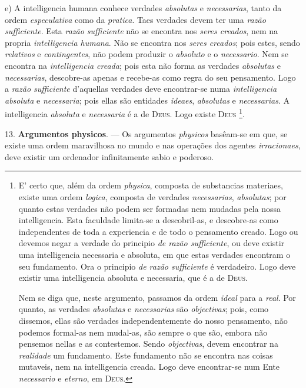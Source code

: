 e) A intelligencia humana conhece verdades \emph{absolutas} e \emph{necessarias}, tanto da ordem \emph{especulativa} como da \emph{pratica}. Taes verdades devem ter uma \emph{razão sufficiente}. Esta \emph{razão sufficiente} não se encontra nos \emph{seres creados}, nem na propria \emph{intelligencia humana}. Não se encontra nos \emph{seres creados}; pois estes, sendo \emph{relativos} e \emph{contingentes}, não podem produzir o \emph{absoluto} e o \emph{necessario}. Nem se encontra na \emph{intelligencia creada}; pois esta não forma as verdades \emph{absolutas} e \emph{necessarias}, descobre-as apenas e recebe-as como regra do seu pensamento. Logo a \emph{razão sufficiente} d'aquellas verdades deve encontrar-se numa \emph{intelligencia absoluta} e \emph{necessaria}; pois ellas são entidades \emph{ideaes}, \emph{absolutas} e \emph{necessarias}. A intelligencia \emph{absoluta} e \emph{necessaria} é a de \textsc{Deus}. Logo existe \textsc{Deus} \footnote{E' certo que, além da ordem \emph{physica}, composta de substancias materiaes, existe uma ordem \emph{logica}, composta de verdades \emph{necessarias}, \emph{absolutas}; por quanto estas verdades não podem ser formadas nem mudadas pela nossa intelligencia. Esta faculdade limita-se a descobril-as, e descobre-as como independentes de toda a experiencia e de todo o pensamento creado. Logo ou devemos negar a verdade do principio \emph{de razão sufficiente}, ou deve existir uma intelligencia necessaria e absoluta, em que estas verdades encontram o seu fundamento. Ora o principio \emph{de razão sufficiente} é verdadeiro. Logo deve existir uma intelligencia absoluta e necessaria, que é a de \textsc{Deus}.\par Nem se diga que, neste argumento, passamos da ordem \emph{ideal} para a \emph{real}. Por quanto, as verdades \emph{absolutas} e \emph{necessarias} são \emph{objectivas}; pois, como dissemos, ellas são verdades independentemente do nosso pensamento, não podemos formal-as nem mudal-as, são sempre o que são, embora não pensemos nellas e as contestemos. Sendo \emph{objectivas}, devem encontrar na \emph{realidade} um fundamento. Este fundamento não se encontra nas coisas mutaveis, nem na intelligencia creada. Logo deve encontrar-se num Ente \emph{necessario} e \emph{eterno}, em \textsc{Deus}.}.

13. \textbf{Argumentos physicos}. --- Os argumentos \emph{physicos} basêam-se em que, se existe uma ordem maravilhosa no mundo e nas operações dos agentes \emph{irracionaes}, deve existir um ordenador infinitamente sabio e poderoso.

